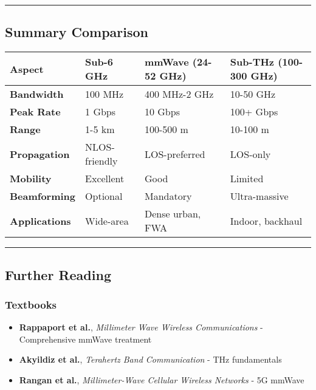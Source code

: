 \begin{center}\rule{0.5\linewidth}{0.5pt}\end{center}

\subsection{\texorpdfstring{ Summary
Comparison}{ Summary Comparison}}\label{summary-comparison}

{\def\LTcaptype{} %
\begin{longtable}[]{@{}llll@{}}
\toprule\noalign{}
Aspect & Sub-6 GHz & mmWave (24-52 GHz) & Sub-THz (100-300 GHz) \\
\midrule\noalign{}
\endhead
\bottomrule\noalign{}
\endlastfoot
\textbf{Bandwidth} & 100 MHz & 400 MHz-2 GHz & 10-50 GHz \\
\textbf{Peak Rate} & 1 Gbps & 10 Gbps & 100+ Gbps \\
\textbf{Range} & 1-5 km & 100-500 m & 10-100 m \\
\textbf{Propagation} & NLOS-friendly & LOS-preferred & LOS-only \\
\textbf{Mobility} & Excellent & Good & Limited \\
\textbf{Beamforming} & Optional & Mandatory & Ultra-massive \\
\textbf{Applications} & Wide-area & Dense urban, FWA & Indoor, backhaul \\
\end{longtable}
}

\begin{center}\rule{0.5\linewidth}{0.5pt}\end{center}

\subsection{\texorpdfstring{ Further
Reading}{ Further Reading}}\label{further-reading}

\subsubsection{Textbooks}\label{textbooks}

\begin{itemize}
\tightlist
\item
  \textbf{Rappaport et al.}, \emph{Millimeter Wave Wireless
  Communications} - Comprehensive mmWave treatment
\item
  \textbf{Akyildiz et al.}, \emph{Terahertz Band Communication} - THz
  fundamentals
\item
  \textbf{Rangan et al.}, \emph{Millimeter-Wave Cellular Wireless
  Networks} - 5G mmWave
\end{itemize}

